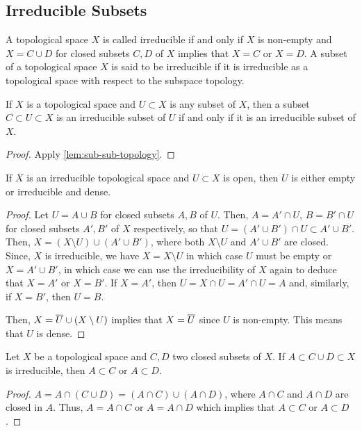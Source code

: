 
\subsection{Irreducible Subsets}

\begin{defn}
A topological space $X$ is called irreducible if and only if
$X$ is non-empty and
$X = C \cup D$ for closed subsets $C, D$ of $X$ implies that
$X = C$ or $X = D$. A subset of a topological space $X$
is said to be irreducible if it is irreducible as a topological
space with respect to the subspace topology.
\end{defn}

\begin{cor}\label{cor:irred-indep}
If $X$ is a topological space and $U \subset X$ is any subset
of $X$, then a subset $C \subset U \subset X$
is an irreducible subset of
$U$ if and only if it is an irreducible subset of $X$.
\end{cor}
\begin{proof}
Apply \cref{lem:sub-sub-topology}.
\end{proof}

\begin{lem}\label{lem:open-of-irred}
If $X$ is an irreducible topological space and
$U \subset X$ is open, then $U$ is either empty or
irreducible and dense.
\end{lem}
\begin{proof}
Let $U = A \cup B$ for closed subsets $A, B$ of $U$.
Then, $A = A' \cap U$, $B = B' \cap U$ for closed subsets $A', B'$
of $X$ respectively, so that $U = (A' \cup B') \cap U \subset A' \cup B'$.
Then, $X = (X \setminus U) \cup (A' \cup B')$, where both $X \setminus U$
and $A' \cup B'$ are closed. Since, $X$ is irreducible, we have
$X = X \setminus U$ in which case $U$ must be empty or
$X = A' \cup B'$, in which case we can use the irreducibility
of $X$ again to deduce that $X = A'$ or $X = B'$. If $X = A'$,
then $U = X \cap U = A' \cap U = A$ and, similarly, if $X = B'$,
then $U = B$.

Then, $X = \cls{U} \cup (X \setminus U)$ implies that
$X = \cls{U}$ since $U$ is non-empty. This means that $U$ is dense.
\end{proof}

\begin{lem}\label{lem:irred-in-union}
Let $X$ be a topological space and $C, D$ two closed subsets of $X$.
If $A \subset C \cup D \subset X$ is irreducible, then
$A \subset C$ or $A \subset D$.
\end{lem}
\begin{proof}
$A = A \cap (C \cup D) = (A \cap C) \cup (A \cap D)$,
where $A \cap C$ and $A \cap D$ are closed in $A$.
Thus, $A = A \cap C$ or $A = A \cap D$
which implies that $A \subset C$ or $A \subset D$.
\end{proof}

